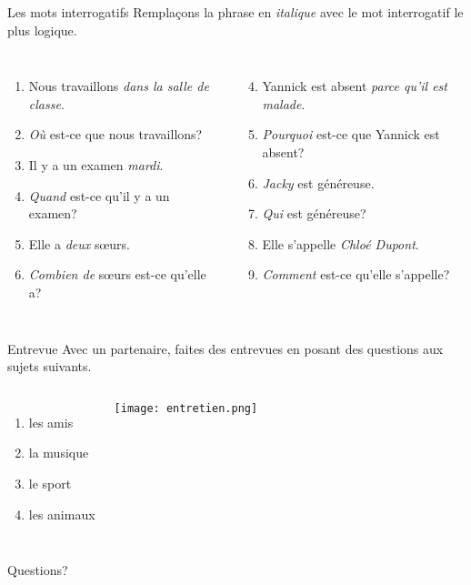 \documentclass{beamer}
\begin{document}
  \begin{frame}{Les mots interrogatifs}
    Remplaçons la phrase en \emph{italique} avec le mot interrogatif le plus logique. \\
    \begin{columns}[t]
        \begin{enumerate}
          \item Nous travaillons \emph{dans la salle de classe}.
          \item<2->[$\to$] \emph{Où} est-ce que nous travaillons?
          \item Il y a un examen \emph{mardi}.
          \item<3->[$\to$] \emph{Quand} est-ce qu'il y a un examen?
          \item Elle a \emph{deux} sœurs.
          \item<4->[$\to$] \emph{Combien de} sœurs est-ce qu'elle a?
        \end{enumerate}
        \begin{enumerate}
          \setcounter{enumi}{3}
          \item Yannick est absent \emph{parce qu'il est malade}.
          \item<5->[$\to$] \emph{Pourquoi} est-ce que Yannick est absent?
          \item \emph{Jacky} est généreuse.
          \item<6->[$\to$] \emph{Qui} est généreuse?
          \item Elle s'appelle \emph{Chloé Dupont}.
          \item<7->[$\to$] \emph{Comment} est-ce qu'elle s'appelle?
        \end{enumerate}
    \end{columns}
  \end{frame}

  \begin{frame}{Entrevue}
    Avec un partenaire, faites des entrevues en posant des questions aux sujets suivants.  \\
    \begin{columns}
        \begin{enumerate}
          \item les amis
          \item la musique
          \item le sport
          \item les animaux
        \end{enumerate}
        \begin{center}
          \texttt{[image: entretien.png]}
        \end{center}
    \end{columns}
  \end{frame}

  \begin{frame}{}
    \begin{center}
      \Large Questions?
    \end{center}
  \end{frame}
\end{document}
